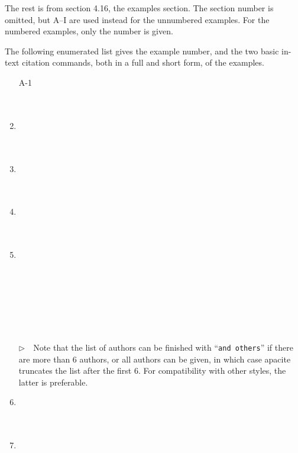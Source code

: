 \documentclass{article}
\newcommand{\EM}{\ensuremath{\triangleright\quad}}
\newcommand{\pkg}[1]{\textsf{#1}}%
\begin{document}
\noindent
The rest is from section 4.16, the examples section. The section number
is omitted, but A--I are used instead for the unnumbered examples. For
the numbered examples, only the number is given.

The following enumerated list gives the example number, and
the two basic in-text citation commands, both in a full and
short form, of the examples.
\begin{enumerate}
\item[A-1] \cite{A-1}  \\ \cite{A-1} \\  \\ 
\item \cite{ex1}  \\ \cite{ex1} \\  \\ 
\item \cite{ex2}  \\ \cite{ex2} \\  \\ 
\item \cite{ex3}  \\ \cite{ex3} \\  \\ 
\item \cite{ex4}  \\ \cite{ex4} \\  \\ \\
      \cite{ex4-2} \\ \cite{ex4-2} \\  \\ \\
      \EM Note that the list of authors can be finished with
      ``\verb+and others+'' if there are more than 6 authors, or
      all authors can be given, in which case \pkg{apacite} truncates
      the list after the first 6. For compatibility with other styles,
      the latter is preferable.
\item \cite{ex5}  \\ \cite{ex5} \\  \\ 
\item \cite{ex6}  \\ \cite{ex6} \\  \\ 

\end{enumerate}
\end{document}
